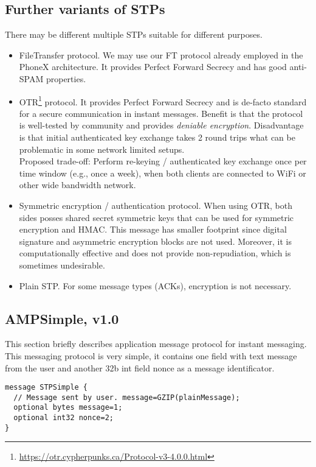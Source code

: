 \documentclass[a4paper,10pt]{article}
\begin{document}
\subsection{Further variants of STPs}
There may be different multiple STPs suitable for different purposes.
\begin{itemize}
 \item FileTransfer protocol. We may use our FT protocol already employed in the PhoneX architecture. It provides Perfect Forward Secrecy
 and has good anti-SPAM properties. 
 
 \item OTR\footnote{\url{https://otr.cypherpunks.ca/Protocol-v3-4.0.0.html}} protocol. It provides Perfect Forward Secrecy and is 
 de-facto standard for a secure communication in instant messages. Benefit is that the protocol is well-tested by community
 and provides \emph{deniable encryption}. Disadvantage is that initial authenticated key exchange takes 2 round trips what can be 
 problematic in some network limited setups. \\
 Proposed trade-off: Perform re-keying / authenticated key exchange once per time window (e.g., once a week), when both clients 
 are connected to WiFi or other wide bandwidth network. 
 
 \item Symmetric encryption / authentication protocol. When using OTR, both sides posses shared secret symmetric keys that can be used
 for symmetric encryption and HMAC. This message has smaller footprint since digital signature and asymmetric encryption blocks
 are not used. Moreover, it is computationally effective and does not provide non-repudiation, which is sometimes undesirable.
 
 \item Plain STP. For some message types (ACKs), encryption is not necessary.
\end{itemize}


\subsection{AMPSimple, v1.0}
This section briefly describes application message protocol for instant messaging. This messaging protocol is very simple,
it contains one field with text message from the user and another 32b int field nonce as a message identificator.

\begin{Verbatim}[frame=single]
message STPSimple {
  // Message sent by user. message=GZIP(plainMessage);
  optional bytes message=1;
  optional int32 nonce=2;
}
\end{Verbatim} 
\end{document}
